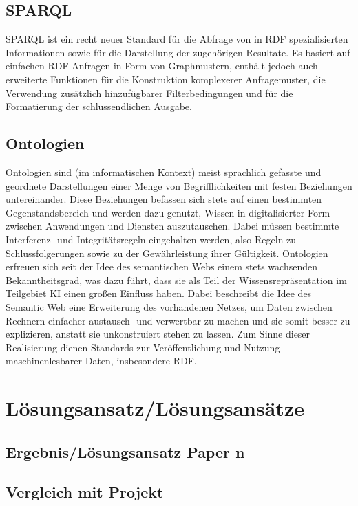 \documentclass[headsepline,titlepage,ngerman,twoside,12pt]{report}
\newcommand\todo[1]{}%
\begin{document}
\section{SPARQL}
\ac{SPARQL} ist ein recht neuer Standard für die Abfrage von in RDF spezialisierten Informationen sowie für die Darstellung der zugehörigen Resultate. Es basiert auf einfachen RDF-Anfragen in Form von Graphmustern, enthält jedoch auch erweiterte Funktionen für die Konstruktion komplexerer Anfragemuster, die Verwendung zusätzlich hinzufügbarer Filterbedingungen und für die Formatierung der schlussendlichen Ausgabe.
\section {Ontologien}
Ontologien sind (im informatischen Kontext) meist sprachlich gefasste und geordnete Darstellungen einer Menge von Begrifflichkeiten mit festen Beziehungen untereinander. Diese Beziehungen befassen sich stets auf einen bestimmten Gegenstandsbereich und werden dazu genutzt, Wissen in digitalisierter Form zwischen Anwendungen und Diensten auszutauschen. Dabei müssen bestimmte Interferenz- und Integritätsregeln eingehalten werden, also Regeln zu Schlussfolgerungen sowie zu der Gewährleistung ihrer Gültigkeit. Ontologien erfreuen sich seit der Idee des semantischen Webs einem stets wachsenden Bekanntheitsgrad, was dazu führt, dass sie als Teil der Wissensrepräsentation im Teilgebiet \ac{KI} einen großen Einfluss haben. Dabei beschreibt die Idee des Semantic Web eine Erweiterung des vorhandenen Netzes, um Daten zwischen Rechnern einfacher austausch- und verwertbar zu machen und sie somit besser zu explizieren, anstatt sie unkonstruiert stehen zu lassen. Zum Sinne dieser Realisierung dienen Standards zur Veröffentlichung und Nutzung maschinenlesbarer Daten, insbesondere RDF.
\chapter{Lösungsansatz/Lösungsansätze \todo{(bezogen auf Paper, 2--4 Seiten)}}
\todo{Kapitel 3 ist Vorschlag gedacht, der nicht wörtlich übernommen werden muss.
Der Lösungsansatz ist eine kurze Beschreibung der Arbeitshypothese sowie des Vorgehens zur Lösung der in der Einleitung beschriebenen Probleme.}

\section{Ergebnis/Lösungsansatz Paper n}
\section{Vergleich mit Projekt}
\end{document}
